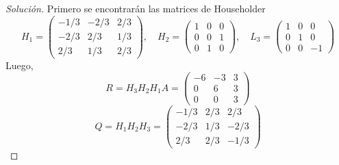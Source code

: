 \documentclass[12pt]{book}
\newenvironment{solucion}
  {\renewcommand\qedsymbol{$\square$}\begin{proof}[Solución]}
  {\end{proof}}
\begin{document}
\begin{solucion}
Primero se encontrarán las matrices de Householder
\[H_1=\begin{pmatrix}
-1/3 & -2/3 & 2/3\\
-2/3 & 2/3 & 1/3\\
2/3 & 1/3 & 2/3
\end{pmatrix},\quad
H_2=\begin{pmatrix}
1 & 0 & 0\\
0 & 0 & 1\\
0 & 1 & 0
\end{pmatrix},\quad
L_3=\begin{pmatrix}
1 & 0 & 0\\
0 & 1 & 0\\
0 & 0 & -1
\end{pmatrix}\]
Luego,
\[R=H_3H_2H_1A=\begin{pmatrix}
-6 & -3 & 3\\
0 & 6 & 3\\
0 & 0 & 3
\end{pmatrix}\]
\[Q=H_1H_2H_3=\begin{pmatrix}
-1/3 & 2/3 & 2/3\\
-2/3 & 1/3 & -2/3\\
2/3 & 2/3 & -1/3
\end{pmatrix}\]
\end{solucion}
\end{document}
